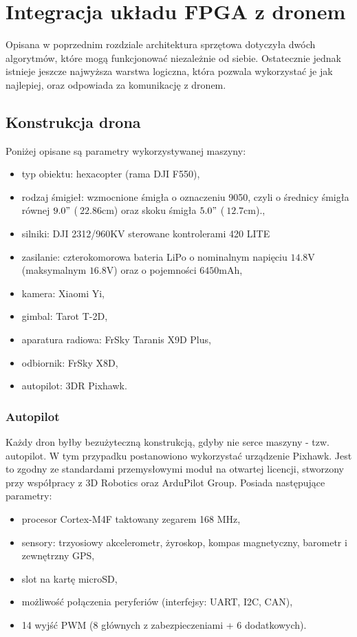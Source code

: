 \chapter{Integracja układu FPGA z dronem}
Opisana w poprzednim rozdziale architektura sprzętowa dotyczyła dwóch algorytmów, które mogą funkcjonować niezależnie od siebie. Ostatecznie jednak istnieje jeszcze najwyższa warstwa logiczna, która pozwala wykorzystać je jak najlepiej, oraz odpowiada za komunikację z dronem.

\section{Konstrukcja drona}
Poniżej opisane są parametry wykorzystywanej maszyny:
\begin{itemize}
	 \item typ obiektu: hexacopter (rama DJI F550),
	 \item rodzaj śmigieł: wzmocnione śmigła o oznaczeniu 9050, czyli o średnicy śmigła równej $9.0"$ ($~22.86$cm) oraz skoku śmigła $5.0"$ ($~12.7$cm).,
	 \item silniki: DJI 2312/960KV sterowane kontrolerami 420 LITE
	 \item zasilanie: czterokomorowa bateria LiPo o nominalnym napięciu $14.8$V (maksymalnym $16.8$V) oraz o pojemności $6450$mAh,
	 \item kamera: Xiaomi Yi,
	 \item gimbal: Tarot T-2D,
	 \item aparatura radiowa: FrSky Taranis X9D Plus,
	 \item odbiornik: FrSky X8D,
	 \item autopilot: 3DR Pixhawk.
\end{itemize}
\subsection{Autopilot}

Każdy dron byłby bezużyteczną konstrukcją, gdyby nie serce maszyny - tzw. autopilot. W tym przypadku postanowiono wykorzystać urządzenie Pixhawk. Jest to zgodny ze standardami przemysłowymi moduł na otwartej licencji, stworzony przy współpracy z 3D Robotics oraz ArduPilot Group. Posiada następujące parametry:
\begin{itemize}
	\item procesor Cortex-M4F taktowany zegarem 168 MHz,
	\item sensory: trzyosiowy akcelerometr, żyroskop, kompas magnetyczny, barometr i zewnętrzny GPS,
	\item slot na kartę microSD,
	\item możliwość połączenia peryferiów (interfejsy: UART, I2C, CAN),
	\item 14 wyjść PWM (8 głównych z zabezpieczeniami + 6 dodatkowych).
\end{itemize}

